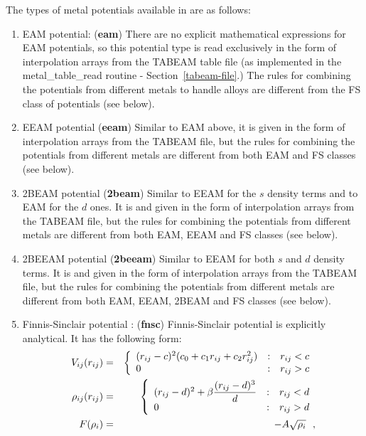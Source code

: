 The types of metal potentials available in \D are as follows:
\begin{enumerate}
\item EAM potential:  ({\bf eam})
There are no explicit mathematical expressions for EAM potentials, so
this potential type is read exclusively in the form of interpolation
arrays from the TABEAM table file (as implemented in the {\sc
metal\_table\_read} routine - Section~\ref{tabeam-file}.)  The rules
for combining the potentials from different metals to handle alloys
are different from the FS class of potentials (see below).
\item EEAM potential ({\bf eeam})
Similar to EAM above, it is given in the form of interpolation arrays
from the TABEAM file, but the rules for combining the potentials from
different metals are different from both EAM and FS classes (see below).
\item 2BEAM potential ({\bf 2beam})
Similar to EEAM for the $s$ density terms and to EAM for the $d$ ones.
It is and given in the form of interpolation arrays from the TABEAM file,
but the rules for combining the potentials from different metals are
different from both EAM, EEAM and FS classes (see below).
\item 2BEEAM potential ({\bf 2beeam})
Similar to EEAM for both $s$ and $d$ density terms. It is and given in
the form of interpolation arrays from the TABEAM file, but the rules for
combining the potentials from different metals are
different from both EAM, EEAM, 2BEAM and FS classes (see below).
\item Finnis-Sinclair potential \cite{finnis-84a}:  ({\bf fnsc})
Finnis-Sinclair potential is explicitly analytical.  It has the following form:
\begin{eqnarray}
V_{ij}(r_{ij}) &=& \left\{ \begin{array} {l@{\quad:\quad}l}
(r_{ij}-c)^{2} (c_{0}+c_{1}r_{ij}+c_{2}r_{ij}^{2}) & r_{ij} < c \\
0 & r_{ij} > c
\end{array} \right. \nonumber \\
\rho_{ij}(r_{ij}) &=& \left\{ \begin{array} {l@{\quad:\quad}l}
(r_{ij}-d)^{2} + \beta \displaystyle \frac{(r_{ij}-d)^{3}}{d} & r_{ij} < d \\
0 & r_{ij} > d
\end{array} \right. \\
F(\rho_{i}) &=& -A \sqrt{\rho_{i}}~~, \nonumber

\end{eqnarray}
\end{enumerate}
